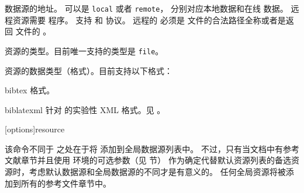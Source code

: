 \begin{ltxsyntax}
\begin{optionlist*}

数据源的地址。
 可以是 \texttt{local} 或者 \texttt{remote}，
分别对应本地数据和在线  数据。
远程资源需要 \biber{} 程序。
支持  和  协议。
远程的  必须是  文件的合法路径全称或者是返回  文件的 。



资源的类型。目前唯一支持的类型是 \texttt{file}。



资源的数据类型（格式）。目前支持以下格式：

\begin{valuelist}[zoterordfxml]

\item[bibtex] %
\BibTeX 格式。

\item[biblatexml] %
针对 \biblatex 的实验性 XML 格式。见 。

\end{valuelist}

\end{optionlist*}


[options]{resource}


该命令不同于  之处在于将  添加到全局数据源列表中。
不过，只有当文档中有参考文献章节并且使用  环境的可选参数（见  节）
作为确定代替默认资源列表的备选资源时，考虑默认数据源和全局数据源的不同才是有意义的。
任何全局资源将被添加到所有的参考文件章节中。


\end{ltxsyntax}
